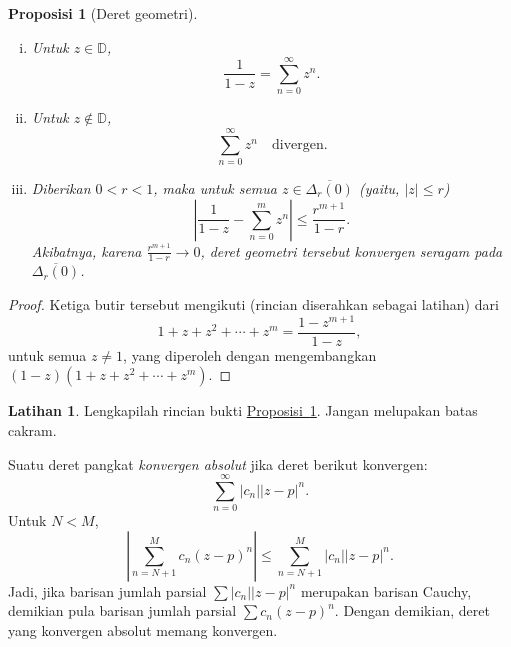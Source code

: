 \documentclass[12pt,openany]{book}
\newcommand{\sabs}[1]{\lvert {#1} \rvert}
\newcommand{\abs}[1]{\left\lvert {#1} \right\rvert}
\newcommand{\D}{{\mathbb{D}}}
\theoremstyle{plain}
\newtheorem{prop}[thm]{Proposisi}
\theoremstyle{remark}
\theoremstyle{definition}
\newenvironment{exbox}{%
    \def\FrameCommand{\vrule width 1pt \relax\hspace{10pt}}%
    \MakeFramed{\advance\hsize-\width\FrameRestore}%
}{%
    \endMakeFramed
}
\theoremstyle{exercise}
\newtheorem{exercise}{Latihan}[section]
\theoremstyle{example}
\newcommand{\propref}[1]{\hyperref[#1]{Proposisi~\ref*{#1}}}
\begin{document}
\begin{prop}[Deret geometri]\label{prop:geomseries}
\leavevmode
\begin{enumerate}[(i)]
\item Untuk $z \in \D$,
\begin{equation*}
\frac{1}{1-z} = \sum_{n=0}^\infty z^n .
\end{equation*}
\item Untuk $z \notin \D$,
\begin{equation*}
\sum_{n=0}^\infty z^n \quad \text{divergen.}
\end{equation*}
\item
Diberikan $0 < r < 1$, maka untuk semua $z \in \overline{\Delta_r(0)}$
(yaitu, $\sabs{z} \leq r$)
\begin{equation*}
\abs{\frac{1}{1-z} - \sum_{n=0}^m z^n}
\leq \frac{r^{m+1}}{1-r} .
\end{equation*}
Akibatnya,
karena $\frac{r^{m+1}}{1-r} \to 0$,
deret geometri tersebut konvergen seragam
pada $\overline{\Delta_r(0)}$.
\end{enumerate}
\end{prop}

\begin{proof}
Ketiga butir tersebut mengikuti (rincian diserahkan sebagai latihan) dari
\begin{equation*}
1+z+z^2+\cdots+z^m = \frac{1-z^{m+1}}{1-z} ,
\end{equation*}
untuk semua $z \neq 1$, yang diperoleh dengan mengembangkan
$(1-z)(1+z+z^2+\cdots+z^m)$.
\end{proof}

\begin{exbox}
\begin{exercise}
Lengkapilah rincian bukti \propref{prop:geomseries}.  Jangan melupakan
batas cakram.
\end{exercise}
\end{exbox}

Suatu deret pangkat \emph{konvergen absolut}%
%
jika deret berikut konvergen:
\begin{equation*}
\sum_{n=0}^\infty \sabs{c_n} \sabs{z-p}^n .
\end{equation*}
Untuk $N < M$,
\begin{equation*}
\abs{\sum_{n=N+1}^M c_n {(z-p)}^n}
\leq
\sum_{n=N+1}^M \sabs{c_n} \sabs{z-p}^n.
\end{equation*}
Jadi, jika barisan jumlah parsial
$\sum \sabs{c_n} \sabs{z-p}^n$ merupakan barisan Cauchy, demikian pula barisan
jumlah parsial $\sum c_n {(z-p)}^n$.  Dengan demikian,
deret yang konvergen absolut
memang konvergen.
\end{document}
